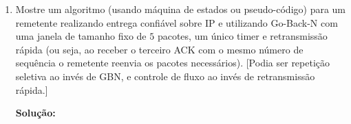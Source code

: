 \documentclass{article}
\begin{document}
\begin{enumerate}
\begin{enumerate}[a)]
\item Dê um exemplo de aplicação para a qual a comutação por circuitos é mais adequada e um para a qual a por pacotes é preferível.
\begin{addmargin}[0.5in]{0.5in}
\par \textbf{Solução:}
A comutação por circuitos é mais adequada para chamadas telefônicas e a comutação por pacotes é mais adequada para comunicações com a internet.
\end{addmargin}

\end{enumerate}

\item Mostre um algoritmo (usando máquina de estados ou pseudo-código) para um remetente realizando entrega confiável sobre IP e utilizando Go-Back-N com uma janela de tamanho fixo de $5$ pacotes, um único timer e retransmissão rápida (ou seja, ao receber o terceiro ACK com o mesmo número de sequência o remetente reenvia os pacotes necessários). [Podia ser repetição seletiva ao invés de GBN, e controle de fluxo ao invés de retransmissão rápida.]
\begin{addmargin}[0.5in]{0.5in}
\par \textbf{Solução:}
%
\end{addmargin}


\end{enumerate}
\end{document}
